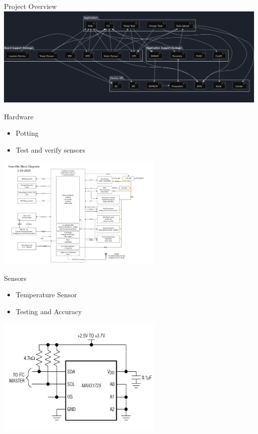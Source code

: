 \begin{frame}{Project Overview}
    \centering
    \includegraphics[height=1\textheight, width=1\textwidth, keepaspectratio]{images/sfSysArch.png}
\end{frame}

\begin{frame}{Hardware}
    \begin{itemize}
        \item Potting 
        \item Test and verify sensors
    \end{itemize}
    \centering    
    \includegraphics[height=0.6\textheight, width=0.6\textwidth, keepaspectratio]{images/schem.png}
\end{frame}

\begin{frame}{Sensors}
    \begin{itemize}
        \item Temperature Sensor
        \item Testing and Accuracy
    \end{itemize}
    \centering    
    \includegraphics[height=0.6\textheight, width=0.6\textwidth, keepaspectratio]{images/MAX31725_ApplicationCircuit.png}
\end{frame}

